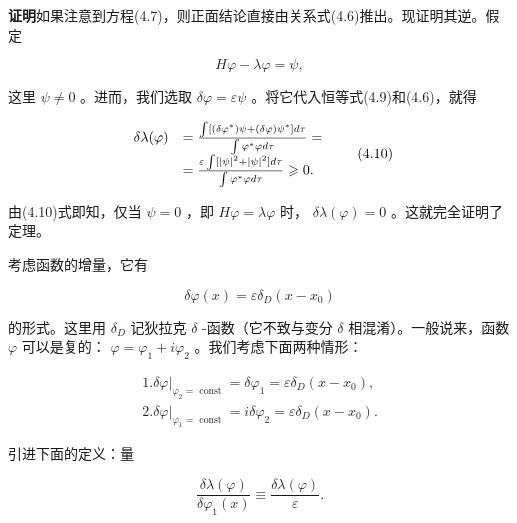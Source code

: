 \textbf{证明}\quad 如果注意到方程(4.7)，则正面结论直接由关系式(4.6)推出。现证明其逆。假定

\begin{equation*}
H \varphi - \lambda \varphi = \psi ,\tag{4.9}
\end{equation*}

这里 $\psi \neq 0$ 。进而，我们选取 $\delta \varphi = \varepsilon \psi$ 。将它代入恒等式(4.9)和(4.6)，就得

\begin{equation*}
\begin{array}{r l} \delta \lambda (\varphi) & = \frac {\int [ (\delta \varphi^ {*}) \psi + (\delta \varphi) \psi^ {*} ] d \tau}{\int \varphi^ {*} \varphi d \tau} = \\ & = \frac {\varepsilon \int [ | \psi | ^ {2} + | \psi | ^ {2} ] d \tau}{\int \varphi^ {*} \varphi d \tau} \geqslant 0. \end{array}\tag{4.10}
\end{equation*}

由(4.10)式即知，仅当 $\psi = 0$ ，即 $H\varphi = \lambda\varphi$ 时， $\delta\lambda(\varphi) = 0$ 。这就完全证明了定理。

考虑函数的增量，它有

\begin{equation*}
\delta \varphi (x) = \varepsilon \delta_ {D} (x - x _ {0})\tag{4.11}
\end{equation*}

的形式。这里用 $\delta_{D}$ 记狄拉克 $\delta$ -函数（它不致与变分 $\delta$ 相混淆）。一般说来，函数 $\varphi$ 可以是复的： $\varphi = \varphi_{1} + i\varphi_{2}$ 。我们考虑下面两种情形：

\begin{equation*}
\begin{array}{l} 1. \delta \varphi | _ {\varphi_ {2} = \text { const }} = \delta \varphi_ {1} = \varepsilon \delta_ {D} (x - x _ {0}), \\ 2. \delta \varphi | _ {\varphi_ {1} = \text { const }} = i \delta \varphi_ {2} = \varepsilon \delta_ {D} (x - x _ {0}). \end{array}
\end{equation*}

引进下面的定义：量

\begin{equation*}
\frac {\delta \lambda (\varphi)}{\delta \varphi_ {1} (x)} \equiv \frac {\delta \lambda (\varphi)}{\varepsilon}.\tag{4.12}
\end{equation*}

